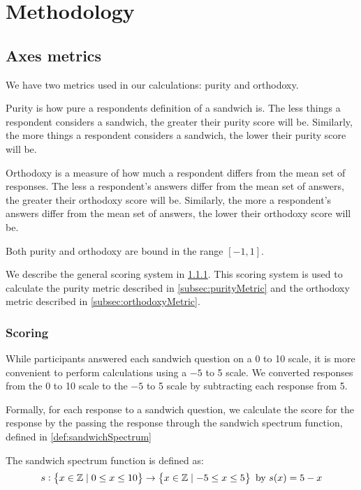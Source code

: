 \chapter{Methodology}

\section{Axes metrics}
We have two metrics used in our calculations: purity and orthodoxy.

Purity is how pure a respondents definition of a sandwich is.
The less things a respondent considers a sandwich, the greater their purity score will be.
Similarly, the more things a respondent considers a sandwich, the lower their purity score will be.

Orthodoxy is a measure of how much a respondent differs from the mean set of responses.
The less a respondent's answers differ from the mean set of answers, the greater their orthodoxy score will be.
Similarly, the more a respondent's answers differ from the mean set of answers, the lower their orthodoxy score will be.

Both purity and orthodoxy are bound in the range $[-1, 1]$.

We describe the general scoring system in \cref{subsec:scoring}.
This scoring system is used to calculate the purity metric described in \cref{subsec:purityMetric} and the orthodoxy metric described in \cref{subsec:orthodoxyMetric}.

\subsection{Scoring}\label{subsec:scoring}
While participants answered each sandwich question on a 0 to 10 scale, it is more convenient to perform calculations using a $-5$ to 5 scale.
We converted responses from the 0 to 10 scale to the $-5$ to 5 scale by subtracting each response from 5.

Formally, for each response to a sandwich question, we calculate the score for the response by the passing the response through the sandwich spectrum function, defined in \cref{def:sandwichSpectrum}

\begin{definition}\label{def:sandwichSpectrum}
	The sandwich spectrum function is defined as:
	\begin{equation}
		s : \set{x \in \mathbb{Z}\mid0 \leq x \leq 10} \to \set{x \in \mathbb{Z}\mid-5 \leq x \leq 5}\ \text{by}\ s(x) = 5 - x
	\end{equation}
\end{definition}

